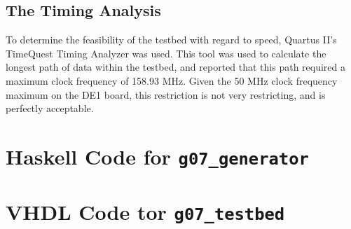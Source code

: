 \documentclass[12pt]{report}
\begin{document}
\section*{The Timing Analysis}
To determine the feasibility of the testbed with regard to speed, Quartus II's TimeQuest Timing
Analyzer was used. This tool was used to calculate the longest path of data within the testbed, and
reported that this path required a maximum clock frequency of 158.93 MHz. Given the 50 MHz clock
frequency maximum on the DE1 board, this restriction is not very restricting, and is perfectly
acceptable.
\begin{appendices}
	\chapter{Haskell Code for \texttt{g07\_generator}}
	\label{app:hs}
	
	\chapter{VHDL Code tor \texttt{g07\_testbed}}
	\label{app:testbedvhdl}
	

\end{appendices}
\end{document}
